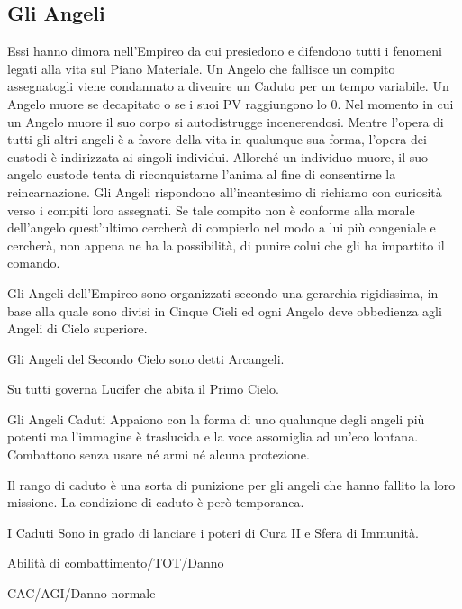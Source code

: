 \subsection{Gli Angeli}

Essi hanno dimora nell'Empireo da cui presiedono e difendono tutti i fenomeni
legati alla vita sul Piano Materiale. 
Un Angelo che fallisce un compito assegnatogli viene condannato a divenire un
Caduto per un tempo variabile. Un Angelo muore se decapitato o se i suoi PV
raggiungono lo 0. Nel momento in cui un Angelo muore il suo corpo si autodistrugge
incenerendosi. Mentre l'opera di tutti gli altri angeli \`e a favore della
vita in qualunque sua forma, l'opera dei custodi \`e indirizzata ai singoli
individui. Allorch\'e un individuo muore, il suo angelo custode tenta di riconquistarne
l'anima al fine di consentirne la reincarnazione. Gli Angeli rispondono all'incantesimo
di richiamo con curiosit\`a verso i compiti loro assegnati. Se tale compito
non \`e conforme alla morale dell'angelo quest'ultimo cercher\`a di compierlo
nel modo a lui pi\`u congeniale e cercher\`a, non appena ne ha la possibilit\`a,
di punire colui che gli ha impartito il comando. 

Gli Angeli dell'Empireo sono organizzati secondo una gerarchia
rigidissima, in base alla quale sono divisi in Cinque Cieli ed ogni
Angelo deve obbedienza agli Angeli di Cielo superiore. 

Gli Angeli del Secondo Cielo sono detti Arcangeli.

Su tutti governa Lucifer che abita il Primo Cielo.


Gli Angeli Caduti Appaiono con la forma di uno qualunque degli angeli
pi\`u potenti ma l'immagine \`e traslucida e la voce assomiglia ad
un'eco lontana. Combattono senza usare n\'e armi n\'e alcuna
protezione.

Il rango di caduto \`e una sorta di punizione per gli angeli che
hanno fallito la loro missione. La condizione di caduto \`e per\`o temporanea.

I Caduti Sono in grado di lanciare i poteri di Cura II e Sfera di
Immunit\`a.

\begin{parmostro}{Abilit\`a di combattimento/TOT/Danno}
\item CAC/AGI/Danno normale
\end{parmostro}


